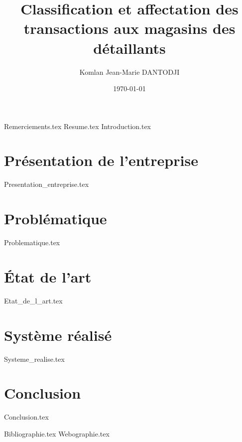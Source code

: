 \documentclass[a4paper,12pt,twoside]{book}
\author{Komlan Jean-Marie \scshape{DANTODJI}}
\title{Classification et affectation des transactions aux magasins des détaillants}
\date{\today} %
\begin{document}
\fancyhead{}
\fancyhead[RO,LE]{\thepage}
\fancyhead[RE]{\textit{\leftmark}}
\fancyhead[LO]{\textit{\rightmark}}
\renewcommand{\headrulewidth}{0.4pt}

\fancyfoot{}
\fancyfoot[LE]{\theauthor}
\fancyfoot[LO]{\scshape \thetitle}

\dominitoc
\doparttoc

\pagedegarde
{}
{Remerciements.tex}
{Resume.tex}
{Introduction.tex}

\part{Présentation de l'entreprise}
\parttoc
{Presentation_entreprise.tex}

\part{Problématique}
\parttoc
{Problematique.tex}

\part{État de l'art}
\parttoc
{Etat_de_l_art.tex}

\part{Système réalisé}
\parttoc
{Systeme_realise.tex}

\part{Conclusion}
\parttoc
{Conclusion.tex}

{Bibliographie.tex}
\newpage
{Webographie.tex}

%
%


\listoffigures
\listoftables
\tableofcontents


\end{document}
